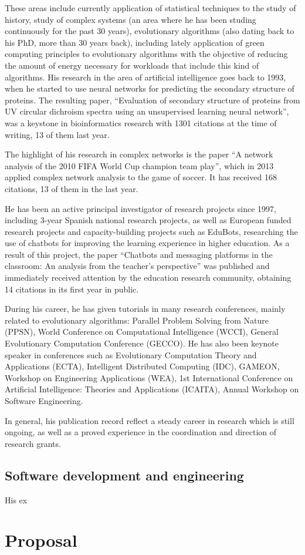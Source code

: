 \documentclass[a4paper]{article}
\begin{document}
These areas include currently application of statistical techniques to the study of history, study of complex systems (an area where he has been studing continuously for the past 30 years), evolutionary algorithms (also dating back to his PhD, more than 30 years back), including lately application of green computing principles to evolutionary algorithms with the objective of reducing the amount of energy necessary for workloads that include this kind of algorithms. His research in the area of artificial intelligence goes back to 1993, when he started to use neural networks for predicting the secondary structure of proteins. The resulting paper, ``Evaluation of secondary structure of proteins from UV circular dichroism spectra using an unsupervised learning neural network'', was a keystone in bioinformatics research with 1301 citations at the time of writing, 13 of them last year.

The highlight of his research in complex networks is the paper ``A network analysis of the 2010 FIFA World Cup champion team play'', which in 2013 applied complex network analysis to the game of soccer. It has received 168 citations, 13 of them in the last year.

He has been an active principal investigator of research projects since 1997, including 3-year Spanish national research projects, as well as European funded research projects and capacity-building projects such as EduBots, researching the use of chatbots for improving the learning experience in higher education. As a result of this project, the paper ``Chatbots and messaging platforms in the classroom: An analysis from the teacher’s perspective'' was published and immediately received attention by the education research community, obtaining 14 citations in its first year in public.

During his career, he has given tutorials in many research conferences, mainly related to evolutionary algorithms: Parallel Problem Solving from Nature (PPSN), World Conference on Computational Intelligence (WCCI), General Evolutionary Computation Conference (GECCO). He has also been keynote speaker in conferences such as Evolutionary Computation Theory and Applications (ECTA), Intelligent Distributed Computing (IDC), GAMEON, Workshop on Engineering Applications (WEA), 1st International Conference on Artificial Intelligence: Theories and Applications (ICAITA), Annual Workshop on Software Engineering.

In general, his publication record reflect a steady career in research which is still ongoing, as well as a proved experience in the coordination and direction of research grants.

\subsection{Software development and engineering}

His ex

\section{Proposal}



\end{document}
